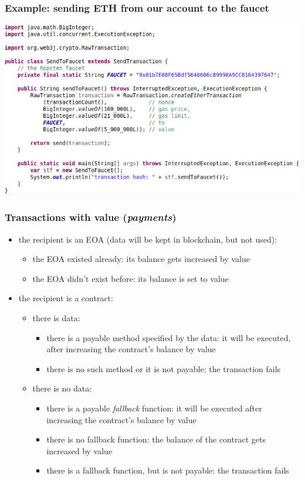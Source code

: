\documentclass[11pt]{beamer}  %
\begin{document}
\begin{frame}\frametitle{Example: sending ETH from our account to the faucet}

  \begin{center}
    \includegraphics[width=\textwidth,clip=false]{pictures/send-ether-transaction-java.png}
  \end{center}

\end{frame}

\begin{frame}\frametitle{Transactions with value (\emph{payments})}

  \begin{itemize}
  \item the recipient is an EOA (data will be kept in blockchain, but not used):
    \begin{itemize}
    \item the EOA existed already: its balance gets increased by value
    \item the EOA didn't exist before: its balance is set to value
    \end{itemize}
  \item the recipient is a contract:
    \begin{itemize}
    \item there is data:
      \begin{itemize}
      \item there is a \alert{payable} method specified by the data: it will be  executed, after increasing the contract's balance by value
      \item there is no such method or it is not payable: the transaction fails
      \end{itemize}
    \item there is no data:
      \begin{itemize}
      \item there is a \alert{payable \emph{fallback} function}: it will be executed after
        increasing the contract's balance by value
      \item there is no fallback function: the balance of the contract gets increased by value
      \item there is a fallback function, but is not payable: the transaction fails
      \end{itemize}
    \end{itemize}
  \end{itemize}

\end{frame}
\end{document}
